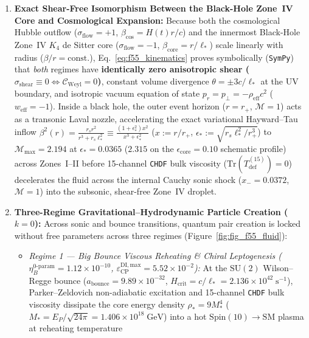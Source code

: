 \documentclass[11pt,a4paper]{article}
\theoremstyle{remark}
\begin{document}
\begin{enumerate}
  \item \textbf{Exact Shear-Free Isomorphism Between the Black-Hole Zone~IV Core and Cosmological Expansion:} Because both the cosmological Hubble outflow ($\sigma_{\mathrm{flow}} = +1$, $\beta_{\mathrm{cos}} = H(t)r/c$) and the innermost Black-Hole Zone~IV $K_4$ de Sitter core ($\sigma_{\mathrm{flow}} = -1$, $\beta_{\mathrm{core}} = r/\ell_*$) scale linearly with radius ($\beta/r = \mathrm{const.}$), Eq.~\eqref{eq:f55_kinematics} proves symbolically (\texttt{SymPy}) that \emph{both} regimes have \textbf{identically zero anisotropic shear ($\sigma_{\mathrm{shear}} \equiv 0 \iff \mathcal{C}_{\mathrm{Weyl}} = 0$)}, constant volume divergence $\theta = \pm 3c/\ell_*$ at the UV boundary, and isotropic vacuum equation of state $p_r = p_\perp = -\rho_{\mathrm{eff}}c^2$ ($w_{\mathrm{eff}} = -1$). Inside a black hole, the outer event horizon ($r = r_+$, $\mathcal{M} = 1$) acts as a transonic Laval nozzle, accelerating the exact variational Hayward--Tau inflow $\beta^2(r) = \frac{r_s r^2}{r^3 + r_s\ell_*^2} \equiv \frac{(1+\epsilon_*^2)x^2}{x^3+\epsilon_*^2}$ ($x := r/r_+$, $\epsilon_* := \sqrt{r_s\ell_*^2/r_+^3}$) to $\mathcal{M}_{\max} = 2.194$ at $\epsilon_* = 0.0365$ ($2.315$ on the $\epsilon_{\mathrm{core}} = 0.10$ schematic profile) across Zones~I--II before 15-channel \texttt{CHDF} bulk viscosity ($\mathrm{Tr}(T_{\mathrm{def}}^{(15)}) = 0$) decelerates the fluid across the internal Cauchy sonic shock ($x_- = 0.0372$, $\mathcal{M} = 1$) into the subsonic, shear-free Zone~IV droplet.
  \item \textbf{Three-Regime Gravitational--Hydrodynamic Particle Creation ($k = 0$):} Across sonic and bounce transitions, quantum pair creation is locked without free parameters across three regimes (Figure~\ref{fig:fig_f55_fluid}):
  \begin{itemize}
    \item \emph{Regime 1 --- Big Bounce Viscous Reheating \& Chiral Leptogenesis ($\eta_B^{\mathrm{0\text{-}param}} = 1.12\times 10^{-10}$, $\varepsilon_{\mathrm{CP}}^{\mathrm{DI,max}} = 5.52\times 10^{-2}$):} At the $\mathrm{SU}(2)$ Wilson--Regge bounce ($a_{\mathrm{bounce}} = 9.89\times 10^{-32}$, $H_{\mathrm{crit}} = c/\ell_* = 2.136\times 10^{42}\;\mathrm{s}^{-1}$), Parker--Zeldovich non-adiabatic excitation and 15-channel \texttt{CHDF} bulk viscosity dissipate the core energy density $\rho_* = 9M_*^4$ ($M_* = E_P/\sqrt{24\pi} = 1.406\times 10^{18}\;\mathrm{GeV}$) into a hot $\mathrm{Spin}(10)\to\mathrm{SM}$ plasma at reheating temperature

\end{itemize}
\end{enumerate}
\end{document}
